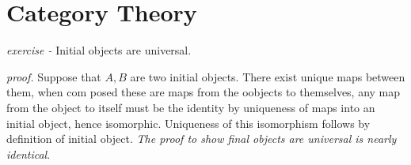 \documentclass[11pt]{article}
\theoremstyle{definition}
\begin{document}
    \section{Category Theory}

    \emph{exercise - } Initial objects are universal. 
    
    \emph{proof.} Suppose that \(A, B\) are two initial objects. There exist unique maps between them, when com posed these are maps from the oobjects to themselves, any map from the object to itself must be the identity by uniqueness of maps into an initial object, hence isomorphic. Uniqueness of this isomorphism follows by definition of initial object. \emph{The proof to show final objects are universal is nearly identical}.
\end{document}
